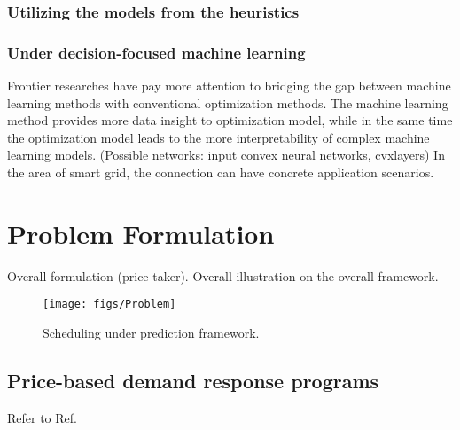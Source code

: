 \documentclass[journal]{IEEEtran}
\newcommand{\slw}{\color{blue}}
\begin{document}
\subsubsection{Utilizing the models from the heuristics}

\subsubsection{Under decision-focused machine learning}
Frontier researches have pay more attention to bridging the gap between machine learning methods with conventional optimization methods. The machine learning method provides more data insight to optimization model, while in the same time the optimization model leads to the more interpretability of complex machine learning models. (Possible networks: input convex neural networks, cvxlayers) In the area of smart grid, the connection can have concrete application scenarios.


\section{Problem Formulation}
Overall formulation (price taker). {\slw Overall illustration on the overall framework.}

\begin{figure}[ht]
  \centering
  \texttt{[image: figs/Problem]}
  \caption{Scheduling under prediction framework.}
  \label{Problemform}
\end{figure}

\subsection{Price-based demand response programs}
{\slw Refer to Ref. \cite{Chitsaz2018}}
\end{document}
